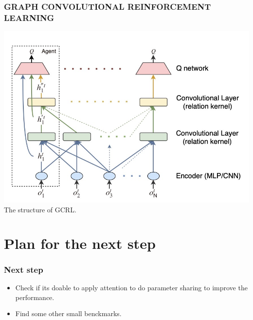 \documentclass[notheorems, aspectratio=54]{beamer}
\begin{document}
\begin{frame}
\frametitle{GRAPH CONVOLUTIONAL REINFORCEMENT LEARNING}
\begin{center}
\begin{minipage}{0.6\textwidth}
  \begin{center}
  \includegraphics[width=\textwidth]{ Graph_Convolutional_RL.png}
  The structure of GCRL. %
  \end{center}
\end{minipage}
\end{center}
\end{frame}

\section{Plan for the next step}
\begin{frame}
\frametitle{Next step}
\begin{itemize}
\item Check if its doable to apply attention to do parameter sharing to improve the performance.
\item Find some other small benckmarks.
\end{itemize}
\end{frame}
\end{document}
